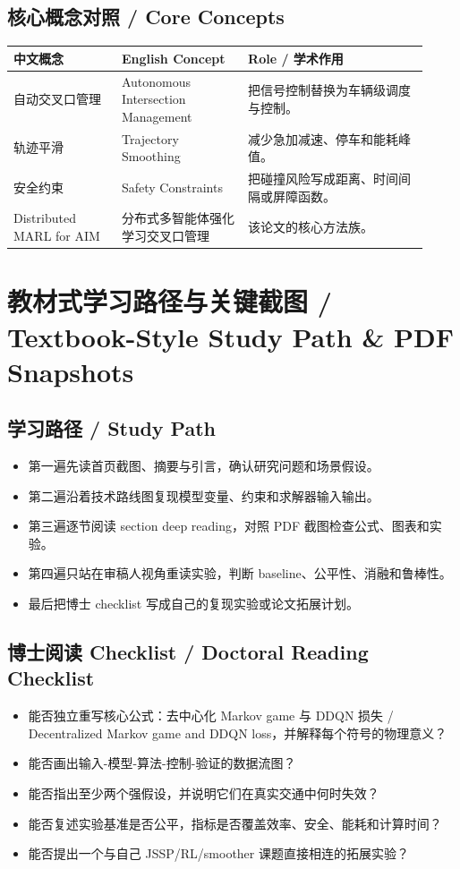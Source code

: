 \documentclass[UTF8,a4paper,11pt,fontset=fandol]{ctexart}
\begin{document}
\subsection{核心概念对照 / Core Concepts}
\begin{longtable}{p{0.24\linewidth}p{0.28\linewidth}p{0.40\linewidth}}
\toprule
中文概念 & English Concept & Role / 学术作用\\
\midrule
自动交叉口管理 & Autonomous Intersection Management & 把信号控制替换为车辆级调度与控制。 \\
轨迹平滑 & Trajectory Smoothing & 减少急加减速、停车和能耗峰值。 \\
安全约束 & Safety Constraints & 把碰撞风险写成距离、时间间隔或屏障函数。 \\
Distributed MARL for AIM & 分布式多智能体强化学习交叉口管理 & 该论文的核心方法族。 \\
\bottomrule
\end{longtable}

\section{教材式学习路径与关键截图 / Textbook-Style Study Path \& PDF Snapshots}
\subsection{学习路径 / Study Path}
\begin{itemize}
\item 第一遍先读首页截图、摘要与引言，确认研究问题和场景假设。
\item 第二遍沿着技术路线图复现模型变量、约束和求解器输入输出。
\item 第三遍逐节阅读 section deep reading，对照 PDF 截图检查公式、图表和实验。
\item 第四遍只站在审稿人视角重读实验，判断 baseline、公平性、消融和鲁棒性。
\item 最后把博士 checklist 写成自己的复现实验或论文拓展计划。
\end{itemize}


\subsection{博士阅读 Checklist / Doctoral Reading Checklist}
\begin{itemize}
\item 能否独立重写核心公式：去中心化 Markov game 与 DDQN 损失 / Decentralized Markov game and DDQN loss，并解释每个符号的物理意义？
\item 能否画出输入-模型-算法-控制-验证的数据流图？
\item 能否指出至少两个强假设，并说明它们在真实交通中何时失效？
\item 能否复述实验基准是否公平，指标是否覆盖效率、安全、能耗和计算时间？
\item 能否提出一个与自己 JSSP/RL/smoother 课题直接相连的拓展实验？
\end{itemize}
\end{document}
